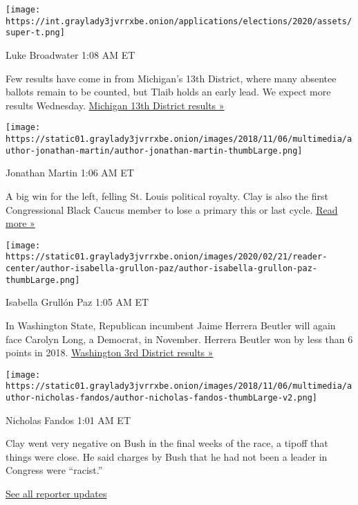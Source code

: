 \texttt{[image: https://int.graylady3jvrrxbe.onion/applications/elections/2020/assets/super-t.png]}

Luke Broadwater 1:08 AM ET

Few results have come in from Michigan's 13th District, where many
absentee ballots remain to be counted, but Tlaib holds an early lead. We
expect more results Wednesday.
\href{https://www.nytimes3xbfgragh.onion/interactive/2020/08/04/us/elections/results-michigan-house-district-13-primary-election.html?action=click\&module=ELEX_results\&pgtype=Interactive\&region=ReporterUpdates}{Michigan
13th District results »}

\texttt{[image: https://static01.graylady3jvrrxbe.onion/images/2018/11/06/multimedia/author-jonathan-martin/author-jonathan-martin-thumbLarge.png]}

Jonathan Martin 1:06 AM ET

A big win for the left, felling St. Louis political royalty. Clay is
also the first Congressional Black Caucus member to lose a primary this
or last cycle.
\href{https://www.nytimes3xbfgragh.onion/2020/08/05/us/politics/cori-bush-missouri-william-lacy-clay.html?action=click\&module=ELEX_results\&pgtype=Interactive\&region=ReporterUpdates}{Read
more »}

\texttt{[image: https://static01.graylady3jvrrxbe.onion/images/2020/02/21/reader-center/author-isabella-grullon-paz/author-isabella-grullon-paz-thumbLarge.png]}

Isabella Grullón Paz 1:05 AM ET

In Washington State, Republican incumbent Jaime Herrera Beutler will
again face Carolyn Long, a Democrat, in November. Herrera Beutler won by
less than 6 points in 2018.
\href{https://www.nytimes3xbfgragh.onion/interactive/2020/08/04/us/elections/results-washington-house-district-3-primary-election.html?action=click\&module=ELEX_results\&pgtype=Interactive\&region=ReporterUpdates}{Washington
3rd District results »}

\texttt{[image: https://static01.graylady3jvrrxbe.onion/images/2018/11/06/multimedia/author-nicholas-fandos/author-nicholas-fandos-thumbLarge-v2.png]}

Nicholas Fandos 1:01 AM ET

Clay went very negative on Bush in the final weeks of the race, a tipoff
that things were close. He said charges by Bush that he had not been a
leader in Congress were ``racist.''

\href{https://www.nytimes3xbfgragh.onion/interactive/2020/08/04/us/elections/live-analysis-arizona-kansas-michigan-missouri-primaries.html?action=click\&module=ELEX_results\&pgtype=Interactive\&region=Component}{See
all reporter updates}

